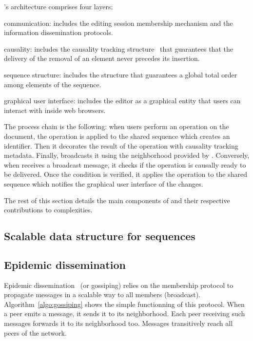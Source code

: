 \CRATE's architecture comprises four layers:
\begin{inparaenum}[(i)]
\item communication: includes the editing session membership mechanism and the
  information dissemination protocols.
\item causality: includes the causality tracking
  structure~\cite{malkhi2007concise} that guarantees that the delivery of the
  removal of an element never precedes its insertion.
\item sequence structure: includes the structure that guarantees a global
  total order among elements of the sequence.
\item graphical user interface: includes the editor as a graphical entity that
  users can interact with inside web browsers.
\end{inparaenum}
The process chain is the following: when users perform an operation on the
document, the operation is applied to the shared sequence which creates an \LSEQ
identifier. Then it decorates the result of the operation with causality
tracking metadata. Finally, \CRATE broadcasts it using the neighborhood provided
by \SPRAY.  Conversely, when \CRATE receives a broadcast message, it checks if
the operation is causally ready to be delivered. Once the condition is verified,
it applies the operation to the shared sequence which notifies the graphical
user interface of the changes.

The rest of this section details the main components of \CRATE and their
respective contributions to complexities.

\subsection{Scalable data structure for sequences}

\subsection{Epidemic dissemination}
\label{subsec:gossiping}

Epidemic dissemination~\cite{birman1999bimodal,demers1987epidemic} (or
gossiping) relies on the membership protocol to propagate messages in a scalable
way to all members (broadcast). Algorithm~\ref{algo:gossiping} shows the simple
functionning of this protocol. When a peer emits a message, it sends it to its
neighborhood. Each peer receiving such messages forwards it to its neighborhood
too. Messages transitively reach all peers of the network.

